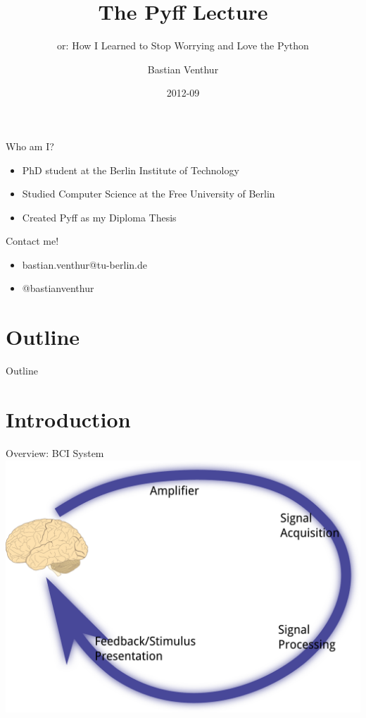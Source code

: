 \documentclass{beamer}
\title{The Pyff Lecture}
\subtitle{or: How I Learned to Stop Worrying and Love the Python}
\author{Bastian Venthur}
\institute{Berlin Institute of Technology}
\date{2012-09}
\begin{document}
\begin{frame}[plain]
    \titlepage
\end{frame}

\begin{frame}{Who am I?}
    \begin{itemize}
        \item PhD student at the Berlin Institute of Technology
        \item Studied Computer Science at the Free University of Berlin
        \item Created Pyff as my Diploma Thesis
    \end{itemize}
    \vfill
    \begin{block}{Contact me!}
        \begin{itemize}
            \item bastian.venthur@tu-berlin.de
            \item @bastianventhur
        \end{itemize}
    \end{block}
\end{frame}

\section*{Outline}
\begin{frame}{Outline}
    \tableofcontents[hidesubsections]
\end{frame}

\section{Introduction}
\begin{frame}{Overview: BCI System}
    \includegraphics[width=\linewidth]{bci_system}
\end{frame}
\end{document}

